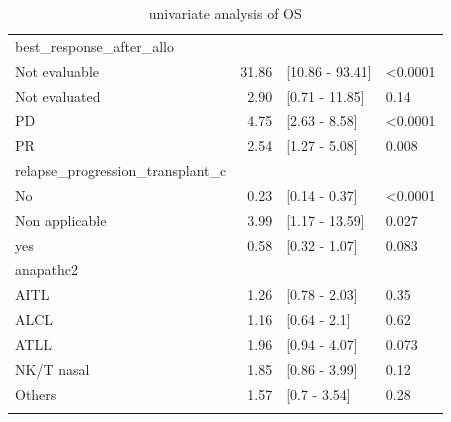 \documentclass[a4paper,11pt] {article}
\begin{document}
\begin{longtable}{lrll}
  best_response_after_allo &  &  &  \\ 
  Not evaluable & 31.86 & [10.86 - 93.41] & <0.0001 \\ 
  Not evaluated & 2.90 & [0.71 - 11.85] & 0.14 \\ 
  PD & 4.75 & [2.63 - 8.58] & <0.0001 \\ 
  PR & 2.54 & [1.27 - 5.08] & 0.008 \\ 
  relapse_progression_transplant_c &  &  &  \\ 
  No & 0.23 & [0.14 - 0.37] & <0.0001 \\ 
  Non applicable  & 3.99 & [1.17 - 13.59] & 0.027 \\ 
  yes & 0.58 & [0.32 - 1.07] & 0.083 \\ 
  anapathc2 &  &  &  \\ 
  AITL & 1.26 & [0.78 - 2.03] & 0.35 \\ 
  ALCL & 1.16 & [0.64 - 2.1] & 0.62 \\ 
  ATLL & 1.96 & [0.94 - 4.07] & 0.073 \\ 
  NK/T nasal & 1.85 & [0.86 - 3.99] & 0.12 \\ 
  Others & 1.57 & [0.7 - 3.54] & 0.28 \\ 
   \hline
\hline
\caption{univariate analysis of OS} 
\label{tab:uos}
\end{longtable}
\end{document}
